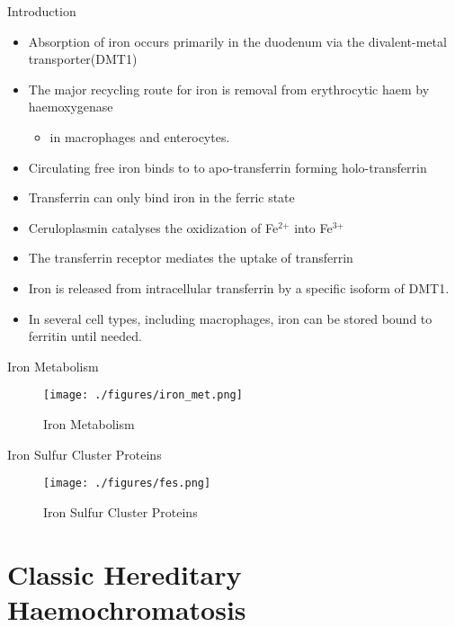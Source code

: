 \documentclass[presentation, smaller]{beamer}
\begin{document}
\begin{frame}[label={sec:org82411e3}]{Introduction}
\begin{itemize}
\item Absorption of iron occurs primarily in the duodenum via the
divalent-metal transporter(DMT1)
\item The major recycling route for iron is removal from
erythrocytic haem by haemoxygenase
\begin{itemize}
\item in macrophages and enterocytes.
\end{itemize}
\item Circulating free iron binds to to apo-transferrin forming holo-transferrin
\item Transferrin can only bind iron in the ferric state
\item Ceruloplasmin catalyses the oxidization of Fe\(^{\text{2+}}\) into Fe\(^{\text{3+}}\)
\item The transferrin receptor mediates the uptake of transferrin
\item Iron is released from intracellular transferrin by a specific isoform of DMT1.
\item In several cell types, including macrophages, iron can be stored
bound to ferritin until needed.
\end{itemize}
\end{frame}

\begin{frame}[label={sec:orgb0857cf}]{Iron Metabolism}
\begin{figure}[htbp]
\centering
\texttt{[image: ./figures/iron\_met.png]}
\caption[iron]{\label{fig:org9dd472d}
Iron Metabolism}
\end{figure}
\end{frame}

\begin{frame}[label={sec:org5bb9047}]{Iron Sulfur Cluster Proteins}
\begin{figure}[htbp]
\centering
\texttt{[image: ./figures/fes.png]}
\caption[fes]{\label{fig:orge50a343}
Iron Sulfur Cluster Proteins}
\end{figure}
\end{frame}


\section{Classic Hereditary Haemochromatosis}
\label{sec:org8c979f2}
\end{document}
